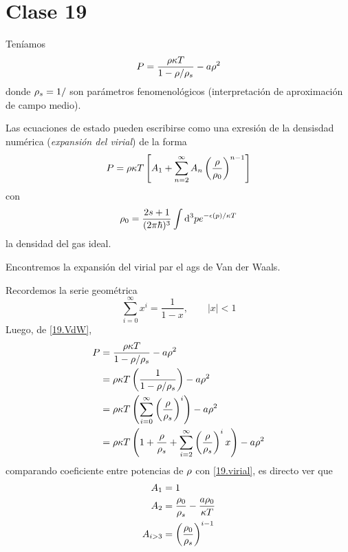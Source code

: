 \section{Clase 19}
Teníamos 
\begin{equation}\label{19.VdW}
  P=\frac{\rho\kappa T}{1-\rho/\rho_s}-a\rho^2
\end{equation}
donde $\rho_s=1/$ son parámetros fenomenológicos (interpretación de aproximación de campo medio).

Las ecuaciones de estado pueden escribirse como una exresión de la densisdad numérica (\textit{expansión del virial}) de la forma
\begin{equation}\label{19.virial}
  P=\rho\kappa T\left[A_1+\sum_{n=2}^\infty A_n\left(\frac{\rho }{\rho_0}\right)^{n-1}\right]
\end{equation}
con
\begin{equation}
  \rho_0=\frac{2s+1}{(2\pi\hbar)^3}\int\dd^3 pe^{-\epsilon(p)/\kappa T}
\end{equation}
la densidad del gas ideal.

\begin{ej}
	Encontremos la expansión del virial par el ags de Van der Waals.
\end{ej}

\begin{sol}
	Recordemos la serie geométrica
	\begin{equation}
  \sum_{i=0}^\infty x^{i}=\frac{1}{1-x},\qquad |x|<1
\end{equation}
Luego, de \eqref{19.VdW},
\begin{align}
  P&=\frac{\rho\kappa T}{1-\rho/\rho_s}-a\rho^2\\
  &=\rho\kappa T\left(\frac{1}{1-\rho/\rho_s}\right)-a\rho^2\\
  &=\rho\kappa T\left(\sum_{i=0}^\infty\left(\frac{\rho }{\rho_s}\right)^{i}\right)-a\rho^2\\
  &=\rho\kappa T\left(1+\frac{\rho}{\rho_s}+\sum_{i=2}^\infty\left(\frac{\rho }{\rho_s}\right)^{i}x\right)-a\rho^2
\end{align}
comparando coeficiente entre potencias de $\rho$ con \eqref{19.virial}, es directo ver que
\begin{align}
  A_1&=1\\
  A_2&=\frac{\rho_0}{\rho_s}-\frac{a\rho_0}{\kappa T}\\
  A_{i>3}&=\left(\frac{\rho_0}{\rho_s}\right)^{i-1}
\end{align}
\end{sol}

